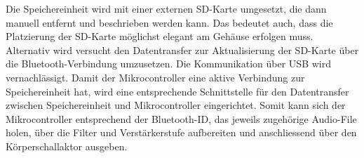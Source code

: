 Die Speichereinheit wird mit einer externen SD-Karte umgesetzt, die dann manuell entfernt und beschrieben werden kann. Das bedeutet auch, dass die Platzierung der SD-Karte möglichst elegant am Gehäuse erfolgen muss. Alternativ wird versucht den Datentransfer zur Aktualisierung der SD-Karte über die Bluetooth-Verbindung umzusetzen. Die Kommunikation über USB wird vernachlässigt. Damit der Mikrocontroller eine aktive Verbindung zur Speichereinheit hat, wird eine entsprechende Schnittstelle für den Datentransfer zwischen Speichereinheit und Mikrocontroller eingerichtet. Somit kann sich der Mikrocontroller entsprechend der Bluetooth-ID, das jeweils zugehörige Audio-File holen, über die Filter und Verstärkerstufe aufbereiten und anschliessend über den Körperschallaktor ausgeben.
